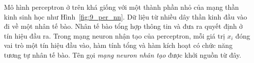 

    


 
Mô hình perceptron ở trên khá giống với một thành phần nhỏ của mạng thần kinh
sinh học như Hình~\ref{fig:9_per_nn}. Dữ liệu từ nhiều dây thần kinh đầu vào đi
về một nhân tế bào. Nhân tế bào tổng hợp thông tin và đưa ra quyết định ở tín
hiệu đầu ra. Trong mạng neuron nhận tạo của perceptron, mỗi giá trị $x_i$ đóng
vai trò một tín hiệu đầu vào, hàm tính tổng và hàm kích hoạt có chức năng tương
tự nhân tế bào. Tên gọi \textit{mạng neuron nhân tạo} được khởi nguồn từ đây.

 
